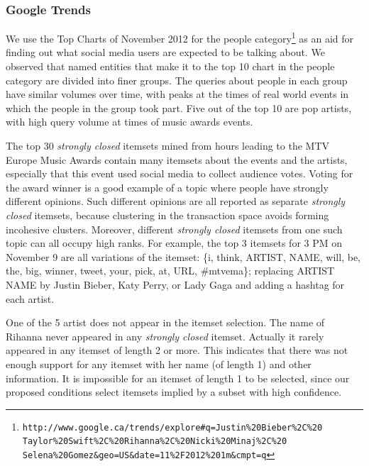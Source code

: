 \documentclass{sig-alternate}
\begin{document}
\subsubsection{Google Trends}
We use the Top Charts of November 2012 
for the people category\footnote{\scriptsize 
\texttt{http://www.google.ca/trends/explore\#q=Justin\%20Bieber\%2C\%20\\
Taylor\%20Swift\%2C\%20Rihanna\%2C\%20Nicki\%20Minaj\%2C\%20\\
Selena\%20Gomez\&geo=US\&date=11\%2F2012\%201m\&cmpt=q}}
as an aid for finding out what social media users
are expected to be talking about.
We observed that named entities that make it to the top 10 chart in the people 
category  are divided into finer groups. 
The queries about 
people in each group 
have similar volumes over time, 
with peaks at the times of real world events
in which the people in the group took part.
Five out of the top 10 are pop artists, 
with high query volume at times of music awards events.

The top 30 \emph{strongly closed} itemsets mined from hours leading to 
the MTV Europe Music Awards contain
many itemsets about the events and the artists, 
especially that this event used social media to collect audience votes. 
Voting for the award winner is 
a good example of a topic where people have strongly different opinions.
Such different opinions are all reported as separate \emph{strongly closed} itemsets, 
because clustering in the transaction space avoids forming incohesive clusters. 
Moreover, different  \emph{strongly closed} itemsets from one such topic
can all occupy high ranks.
For example, the top 3 itemsets for 3 PM on November 9 are all variations of the 
itemset: \{i, think, ARTIST, NAME, will, be, the, big, winner, tweet, your, pick, at, URL, %
\#mtvema\}; replacing ARTIST NAME by Justin Bieber, Katy Perry, or Lady Gaga and adding a hashtag for each artist.

One of the 5 artist does not appear in the itemset selection. 
The name of Rihanna never appeared in any \emph{strongly closed} itemset.
Actually it rarely appeared in any itemset of length 2 or more. 
This indicates that there was not enough support for any itemset
with her name (of length 1) and other information.
It is impossible for an itemset of length 1 to be selected,
since our proposed conditions select itemsets implied
by a subset with high confidence.
\end{document}
